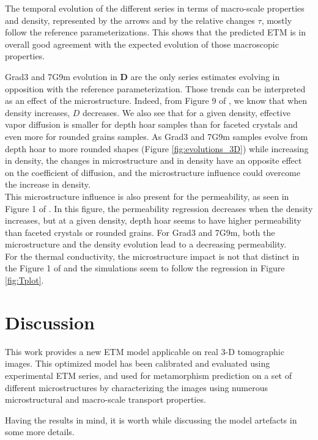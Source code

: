\documentclass[draft,ms]{agujournal2019}
\begin{document}
The temporal evolution of the different series in terms of macro-scale properties and density, represented by the arrows and by the relative changes $\tau$, mostly follow the reference parameterizations. This shows that the predicted ETM is in overall good agreement with the expected evolution of those macroscopic properties. 

Grad3 and 7G9m evolution in \textbf{D} are the only series estimates evolving in opposition with the reference parameterization. Those trends can be interpreted as an effect of the microstructure. Indeed, from Figure 9 of , we know that when density increases, $D$ decreases. We also see that for a given density, effective vapor diffusion is smaller for depth hoar samples than for faceted crystals and even more for rounded grains samples. As Grad3 and 7G9m samples evolve from depth hoar to more rounded shapes (Figure \ref{fig:evolutions_3D}) while increasing in density, the changes in microstructure and in density have an opposite effect on the coefficient of diffusion, and the microstructure influence could overcome the increase in density. \\
This microstructure influence is also present for the permeability, as seen in Figure 1 of . In this figure, the permeability regression decreases when the density increases, but at a given density, depth hoar seems to have higher permeability than faceted crystals or rounded grains. For Grad3 and 7G9m, both the microstructure and the density evolution lead to a decreasing permeability.\\
For the thermal conductivity, the microstructure impact is not that distinct in the Figure 1 of  and the simulations seem to follow the regression in Figure \ref{fig:Tplot}.


\section{Discussion}
\label{sec:disc}

This work provides a new ETM model applicable on real 3-D tomographic images. This optimized model has been calibrated and evaluated using experimental ETM series, and used for metamorphism prediction on a set of different microstructures by characterizing the images using numerous microstructural and macro-scale transport properties.

Having the results in mind, it is worth while discussing the model artefacts in some more details. 
\end{document}

